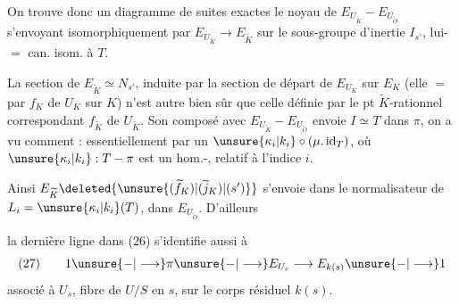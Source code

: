 On trouve donc un diagramme de suites exactes
le noyau  de $E_{U_{\widetilde K}}-E_{U_{\widetilde O}}$ s'envoyant isomorphiquement par $E_{U_{\widetilde K}}\longrightarrow E_{\widetilde K}$ sur le sous-groupe d'inertie $I_{s'}$, lui-$=$ can. isom. à $T$.

La section de  $E_{\widetilde K}\simeq N_{s'}$, induite par la section de départ de $E_{U_K}$ sur $E_K$ (elle $=$  par  $f_K$ de $U_K$ sur $K$) n'est autre bien sûr que celle définie par le pt $\widetilde K$-rationnel correspondant $f_{\widetilde K}$ de $U_{\widetilde K}$. Son composé avec $E_{U_{\widetilde K}}-E_{U_{\widetilde O}}$ envoie $I\simeq T$ dans $\pi$, on a vu comment : essentiellement par un $\unsure{\kappa_i|k_i}\circ(\mu.\operatorname{id}_T)$, où $\unsure{\kappa_i|k_i}:T-\pi$ est un hom.-, relatif à l'indice $i$.

Ainsi  $E_{\widetilde K}\deleted{\unsure{(\widetilde f_K)|(\widetilde j_K)|(s')}}$ s'envoie dans le normalisateur de $L_i=\unsure{\kappa_i|k_i}(T)$, dans $E_{U_{\widetilde O}}$. D'ailleurs

la dernière ligne dans (26) s'identifie aussi à
\[
(27)\qquad 1\unsure{-|\longrightarrow}\pi\unsure{-|\longrightarrow}E_{U_s}\longrightarrow E_{k(s)}\unsure{-|\longrightarrow}1
\]
associé à $U_s$, fibre de $U/S$ en $s$, sur le corps résiduel $k(s)$.

